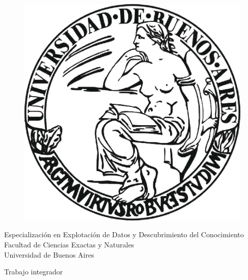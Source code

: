 \documentclass[10 pt]{article}
\begin{document}
\begin{titlepage}

    \begin{center}
    \vspace*{-0.5in}
    \begin{figure}[htb]
    \begin{center}
    \includegraphics[scale=.3]{images/uba2.jpg}
    \end{center}
    \end{figure}
    
    \begin{large}
    Especialización en Explotación de Datos y Descubrimiento del Conocimiento\\
    \vspace*{0.15in}
    Facultad de Ciencias Exactas y Naturales \\
    \vspace*{0.15in}
    Universidad de Buenos Aires \\
    
    \vspace*{0.6in}
    \end{large}
    
    \begin{large}
    Trabajo integrador\\


\end{large}
\end{center}
\end{titlepage}
\end{document}
